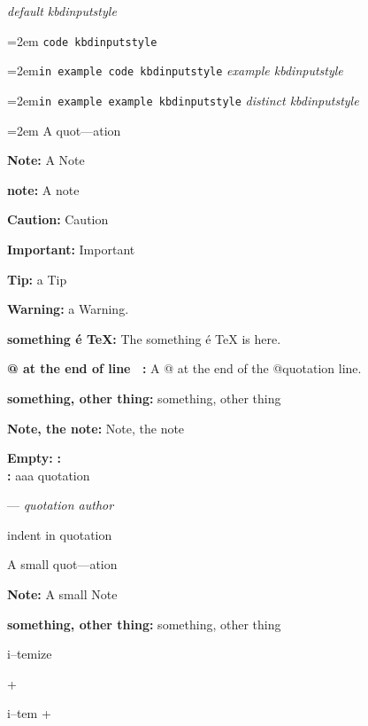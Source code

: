 \documentclass{book}
\begin{document}
\begin{titlepage}
{\ttfamily\textsl{default kbdinputstyle}}
\par\begingroup\obeylines\obeyspaces\frenchspacing\leftskip=2em\relax\parskip=0pt\relax{}
\endgroup{}
\texttt{code kbdinputstyle}
\par\begingroup\obeylines\obeyspaces\frenchspacing\leftskip=2em\relax\parskip=0pt\relax\ttfamily{}\texttt{in example code kbdinputstyle}
\endgroup{}
{\ttfamily\textsl{example kbdinputstyle}}
\par\begingroup\obeylines\obeyspaces\frenchspacing\leftskip=2em\relax\parskip=0pt\relax\ttfamily{}\texttt{in example example kbdinputstyle}
\endgroup{}
{\ttfamily\textsl{distinct kbdinputstyle}}
\par\begingroup\obeylines\obeyspaces\frenchspacing\leftskip=2em\relax\parskip=0pt\relax{}
\endgroup{}
A quot---ation

\textbf{Note:} A Note

\textbf{note:} A note

\textbf{Caution:} Caution

\textbf{Important:} Important

\textbf{Tip:} a Tip

\textbf{Warning:} a Warning.

\textbf{something \'{e} \TeX{}:} The something \'{e} \TeX{} is here.

\textbf{@ at the end of line \ {}:} A @ at the end of the @quotation line.

\textbf{something, other thing:} something, other thing

\textbf{Note, the note:} Note, the note


\textbf{Empty:} 
\textbf{:} 
\textbf{\leavevmode{}\\:} 
aaa quotation
\begin{center}
--- \emph{quotation author}
\end{center}

indent in quotation

A small quot---ation

\textbf{Note:} A small Note

\textbf{something, other thing:} something, other thing

\textbullet{} 

i--temize

+ 

i--tem +

\textbullet{} 


\end{titlepage}
\end{document}
